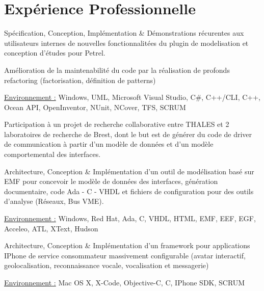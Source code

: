 \documentclass[10pt,letterpaper]{resume/resume}
\begin{document}
  \begin{minipage}[t]{\linewidth}
    \section{Exp\'erience Professionnelle}

\par Sp\'ecification, Conception, Impl\'ementation \& D\'emonstrations r\'ecurentes aux utilisateurs internes de nouvelles fonctionnalit\'ees du plugin de modelisation et conception d'\'etudes pour Petrel.
\par Am\'elioration de la maintenabilit\'e du code par la r\'ealisation de profonds refactoring (factorisation, d\'efinition de patterns)
\par\underline{Environnement :} Windows, UML, Microsoft Visual Studio, C\#, C++/CLI, C++, Ocean API, OpenInventor, NUnit, NCover, TFS, SCRUM

\par Participation à un projet de recherche collaborative entre THALES et 2 laboratoires de recherche de Brest, dont le but est de g\'en\'erer du code de driver de communication à partir d'un modèle de donn\'ees et d'un modèle comportemental des interfaces.
\par Architecture, Conception \& Impl\'ementation d'un outil de mod\'elisation bas\'e sur EMF pour concevoir le modèle de donn\'ees des interfaces, g\'en\'eration documentaire, code Ada - C - VHDL et fichiers de configuration pour des outils d'analyse (R\'eseaux, Bus VME).
\par\underline{Environnement :} Windows, Red Hat, Ada, C, VHDL, HTML, EMF, EEF, EGF, Acceleo, ATL, XText, Hudson

\par Architecture, Conception \& Impl\'ementation d'un framework pour applications IPhone de service consommateur massivement configurable (avatar interactif, geolocalisation, reconnaissance vocale, vocalisation et messagerie) 
\par\underline{Environnement :} Mac OS X, X-Code, Objective-C, C, IPhone SDK, SCRUM


\end{minipage}
\end{document}
